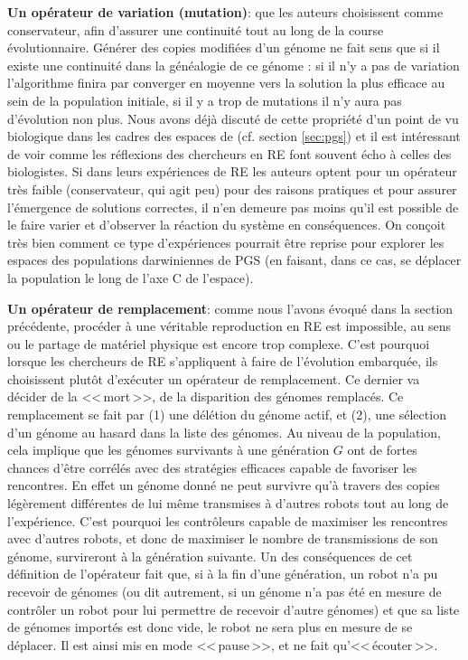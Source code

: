 \textbf{Un opérateur de variation (mutation)}: que les auteurs choisissent comme conservateur, afin d'assurer une continuité tout au long de la course évolutionnaire. Générer des copies modifiées d'un génome ne fait sens que si il existe une continuité dans la généalogie de ce génome : si il n'y a pas de variation l'algorithme finira par converger en moyenne vers la solution la plus efficace au sein de la population initiale, si il y a trop de mutations il n'y aura pas d'évolution non plus. Nous avons déjà discuté de cette propriété d'un point de vu biologique dans les cadres des espaces de \cite{godfrey2009darwinian} (cf. section \ref{sec:pgs}) et il est intéressant de voir comme les réflexions des chercheurs en RE font souvent écho à celles des biologistes. Si dans leurs expériences de RE les auteurs optent pour un opérateur très faible (conservateur, qui agit peu) pour des raisons pratiques et pour assurer l'émergence de solutions correctes, il n'en demeure pas moins qu'il est possible de le faire varier et d'observer la réaction du système en conséquences. On conçoit très bien comment ce type d'expériences pourrait être reprise pour explorer les espaces des populations darwiniennes de PGS (en faisant, dans ce cas, se déplacer la population le long de l'axe C de l'espace). 

\textbf{Un opérateur de remplacement}: comme nous l'avons évoqué dans la section précédente, procéder à une véritable reproduction en RE est impossible, au sens ou le partage de matériel physique est encore trop complexe. C'est pourquoi lorsque les chercheurs de RE s'appliquent à faire de l'évolution embarquée, ils choisissent plutôt d'exécuter un opérateur de remplacement. Ce dernier va décider de la <<\,mort\,>>, de la disparition des génomes remplacés. Ce remplacement se fait par (1) une délétion du génome actif, et (2), une sélection d'un génome au hasard dans la liste des génomes. Au niveau de la population, cela implique que les génomes survivants à une génération $G$ ont de fortes chances d'être corrélés avec des stratégies efficaces capable de favoriser les rencontres. En effet un génome donné ne peut survivre qu'à travers des copies légèrement différentes de lui même transmises à d'autres robots tout au long de l'expérience. C'est pourquoi les contrôleurs capable de maximiser les rencontres avec d'autres robots, et donc de maximiser le nombre de transmissions de son génome, survireront à la génération suivante. Un des conséquences de cet définition de l'opérateur fait que, si à la fin d'une génération, un robot n'a pu recevoir de génomes (ou dit autrement, si un génome n'a pas été en mesure de contrôler un robot pour lui permettre de recevoir d'autre génomes) et que  sa liste de génomes importés est donc vide, le robot ne sera plus en mesure de se déplacer. Il est ainsi mis en mode <<\,pause\,>>, et ne fait qu'<<\,écouter\,>>. 

